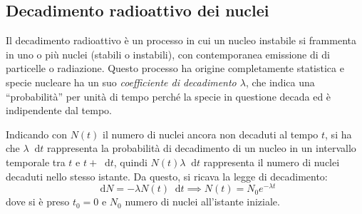\documentclass[11pt, a4paper]{scrartcl}
\theoremstyle{style}
\newcommand{\dd}{\mathop{}\!\mathrm{d}}
\numberwithin{equation}{subsection}
\begin{document}
\begin{center}
\begin{minipage}
	\end{minipage}
\end{center}

\subsection{Decadimento radioattivo dei nuclei}
Il decadimento radioattivo \`e un processo in cui un nucleo instabile si frammenta in uno o pi\`u nuclei (stabili o instabili), con contemporanea emissione di di particelle o radiazione.
Questo processo ha origine completamente statistica e specie nucleare ha un suo \textit{coefficiente di decadimento $\lambda $}, che indica una ``probabilit\`a'' per unit\`a di tempo perch\'e la specie in questione decada ed \`e indipendente dal tempo.

Indicando con $N(t)$ il numero di nuclei ancora non decaduti al tempo $t$, si ha che $\lambda \dd t$ rappresenta la probabilit\`a di decadimento di un nucleo in un intervallo temporale tra $t$ e $t + \dd t$, quindi $N(t) \lambda \dd t $ rappresenta il numero di nuclei decaduti nello stesso istante. 
Da questo, si ricava la legge di decadimento:
\begin{equation}
	\dd N = - \lambda  N(t) \dd t \implies N(t) = N_0 e^{-\lambda t}
\end{equation}
dove si \`e preso $t_0 =0$ e $N_0$ numero di nuclei all'istante iniziale.
\end{document}
